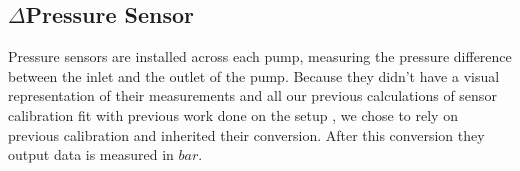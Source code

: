\subsection*{$\Delta$Pressure Sensor}
Pressure sensors are installed across each pump,
measuring the pressure difference between the inlet and the outlet of the pump.\cite{DPT}
Because they didn't have a visual representation of their measurements
and all our previous calculations of sensor calibration fit with previous work done on the setup \cite{Jepsen2017},
we chose to rely on previous calibration and inherited their conversion.
After this conversion they output data is measured in $bar$.